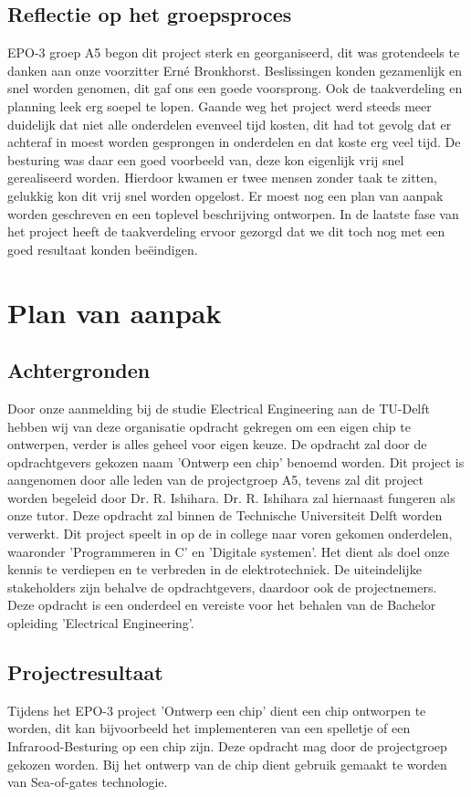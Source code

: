 \documentclass[oneside,dutch]{tudelft-report}
\begin{document}
\section{Reflectie op het groepsproces}
EPO-3 groep A5 begon dit project sterk en georganiseerd, dit was grotendeels te danken aan onze voorzitter Erné Bronkhorst. Beslissingen konden gezamenlijk en snel worden genomen, dit gaf ons een goede voorsprong. Ook de taakverdeling en planning leek erg soepel te lopen. Gaande weg het project werd steeds meer duidelijk dat niet alle onderdelen evenveel tijd kosten, dit had tot gevolg dat er achteraf in moest worden gesprongen in onderdelen en dat koste erg veel tijd. De besturing was daar een goed voorbeeld van, deze kon eigenlijk vrij snel gerealiseerd worden. Hierdoor kwamen er twee mensen zonder taak te zitten, gelukkig kon dit vrij snel worden opgelost. Er moest nog een plan van aanpak worden geschreven en een toplevel beschrijving ontworpen. In de laatste fase van het project heeft de taakverdeling ervoor gezorgd dat we dit toch nog met een goed resultaat konden beëindigen. 

\appendix

\chapter{Plan van aanpak}
\section{Achtergronden}
Door onze aanmelding bij de studie Electrical Engineering aan de TU-Delft hebben wij van deze organisatie opdracht gekregen om een eigen chip te ontwerpen, verder is alles geheel voor eigen keuze. De opdracht zal door de opdrachtgevers gekozen naam 'Ontwerp een chip' benoemd worden. Dit project is aangenomen door alle leden van de projectgroep A5, tevens zal dit project worden begeleid door Dr. R. Ishihara. Dr. R. Ishihara zal hiernaast fungeren als onze tutor. Deze opdracht zal binnen de Technische Universiteit Delft worden verwerkt. Dit project speelt in op de in college naar voren gekomen onderdelen, waaronder 'Programmeren in C' en 'Digitale systemen'. Het dient als doel onze kennis te verdiepen en te verbreden in de elektrotechniek. De uiteindelijke stakeholders zijn behalve de opdrachtgevers, daardoor ook de projectnemers. Deze opdracht is een onderdeel en vereiste voor het behalen van de Bachelor opleiding 'Electrical Engineering'.

\section{Projectresultaat}
Tijdens het EPO-3 project 'Ontwerp een chip' dient een chip ontworpen te worden, dit kan bijvoorbeeld het implementeren van een spelletje of een Infrarood-Besturing op een chip zijn. Deze opdracht mag door de projectgroep gekozen worden. Bij het ontwerp van de chip dient gebruik gemaakt te worden van Sea-of-gates technologie.
\end{document}
